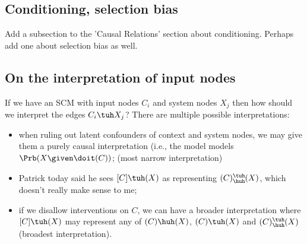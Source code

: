\begin{Rem}
\begin{center}
\end{center}
\end{Rem}

\subsection{Conditioning, selection bias}
Add a subsection to the 'Causal Relations' section about conditioning.
Perhaps add one about selection bias as well.

\subsection{On the interpretation of input nodes}

If we have an SCM with input nodes $C_i$ and system nodes $X_j$ then how should we interpret the edges $C_i \tuh X_j$?
There are multiple possible interpretations:
\begin{itemize}
  \item when ruling out latent confounders of context and system nodes, we may give them a purely causal interpretation (i.e., the model models $\Prb(X \given \doit(C))$; (most narrow interpretation)
  \item Patrick today said he sees $[C] \tuh (X)$ as representing $(C) \substack{\tuh\\\huh} (X)$, which doesn't really make sense to me;
  \item if we disallow interventions on $C$, we can have a broader interpretation where $[C] \tuh (X)$ may represent any of
    $(C) \huh (X)$, $(C) \tuh (X)$ and $(C) \substack{\tuh\\\huh} (X)$ (broadest interpretation).
\end{itemize}

